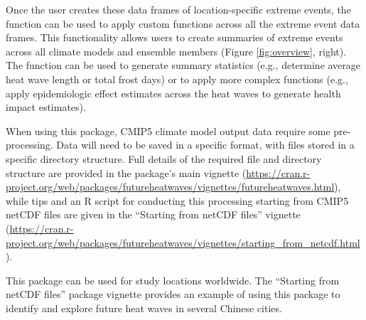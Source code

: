 Once the user creates these data frames of location-specific extreme
events, the  function can be used to apply
custom functions across all the extreme event data frames. This
functionality allows users to create summaries of extreme events across
all climate models and ensemble members (Figure \ref{fig:overview},
right). The function can be used to generate summary statistics (e.g.,
determine average heat wave length or total frost days) or to apply more
complex functions (e.g., apply epidemiologic effect estimates across the
heat waves to generate health impact estimates).

When using this package, CMIP5 climate model output data require some
pre-processing. Data will need to be saved in a specific format, with
files stored in a specific directory structure. Full details of the
required file and directory structure are provided in the package's main
vignette
(\url{https://cran.r-project.org/web/packages/futureheatwaves/vignettes/futureheatwaves.html}),
while tips and an R script for conducting this processing starting from
CMIP5 netCDF files are given in the ``Starting from netCDF files''
vignette
(\url{https://cran.r-project.org/web/packages/futureheatwaves/vignettes/starting_from_netcdf.html}).

This package can be used for study locations worldwide. The ``Starting
from netCDF files'' package vignette provides an example of using this
package to identify and explore future heat waves in several Chinese
cities.

